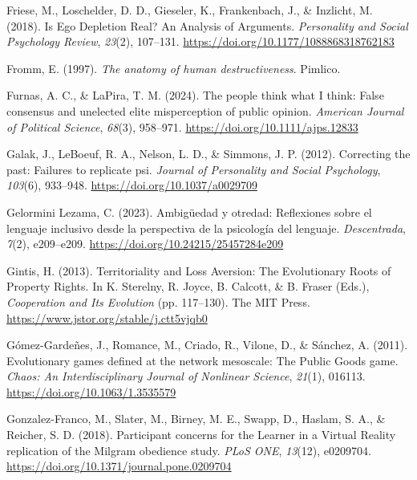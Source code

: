 \documentclass[
  letterpaper,
]{book}
\newlength{\cslhangindent}
\newenvironment{CSLReferences}[2] %
 {\begin{list}{}{%
  \setlength{\itemindent}{0pt}
  \setlength{\leftmargin}{0pt}
  \setlength{\parsep}{0pt}
  \ifodd #1
   \setlength{\leftmargin}{\cslhangindent}
   \setlength{\itemindent}{-1\cslhangindent}
  \fi
  \setlength{\itemsep}{#2\baselineskip}}}
 {\end{list}}
\begin{document}
\begin{CSLReferences}{1}{0}
Friese, M., Loschelder, D. D., Gieseler, K., Frankenbach, J., \&
Inzlicht, M. (2018). Is Ego Depletion Real? An Analysis of Arguments.
\emph{Personality and Social Psychology Review}, \emph{23}(2), 107--131.
\url{https://doi.org/10.1177/1088868318762183}

Fromm, E. (1997). \emph{The anatomy of human destructiveness}. Pimlico.

Furnas, A. C., \& LaPira, T. M. (2024). The people think what {I} think:
{False} consensus and unelected elite misperception of public opinion.
\emph{American Journal of Political Science}, \emph{68}(3), 958--971.
\url{https://doi.org/10.1111/ajps.12833}

Galak, J., LeBoeuf, R. A., Nelson, L. D., \& Simmons, J. P. (2012).
Correcting the past: Failures to replicate psi. \emph{Journal of
Personality and Social Psychology}, \emph{103}(6), 933--948.
\url{https://doi.org/10.1037/a0029709}

Gelormini Lezama, C. (2023). Ambigüedad y otredad: Reflexiones sobre el
lenguaje inclusivo desde la perspectiva de la psicología del lenguaje.
\emph{Descentrada}, \emph{7}(2), e209--e209.
\url{https://doi.org/10.24215/25457284e209}

Gintis, H. (2013). Territoriality and {Loss} {Aversion}: {The}
{Evolutionary} {Roots} of {Property} {Rights}. In K. Sterelny, R. Joyce,
B. Calcott, \& B. Fraser (Eds.), \emph{Cooperation and {Its}
{Evolution}} (pp. 117--130). The MIT Press.
\url{https://www.jstor.org/stable/j.ctt5vjqb0}

Gómez-Gardeñes, J., Romance, M., Criado, R., Vilone, D., \& Sánchez, A.
(2011). Evolutionary games defined at the network mesoscale: {The}
{Public} {Goods} game. \emph{Chaos: An Interdisciplinary Journal of
Nonlinear Science}, \emph{21}(1), 016113.
\url{https://doi.org/10.1063/1.3535579}

Gonzalez-Franco, M., Slater, M., Birney, M. E., Swapp, D., Haslam, S.
A., \& Reicher, S. D. (2018). Participant concerns for the {Learner} in
a {Virtual} {Reality} replication of the {Milgram} obedience study.
\emph{PLoS ONE}, \emph{13}(12), e0209704.
\url{https://doi.org/10.1371/journal.pone.0209704}


\end{CSLReferences}
\end{document}

